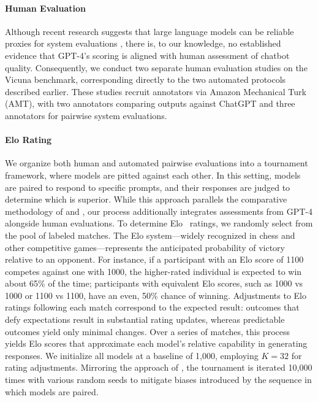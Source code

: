 \paragraph{Human Evaluation} Although recent research suggests that large language models can be reliable proxies for system evaluations \citep{fu2023gptscore}, there is, to our knowledge, no established evidence that GPT-4’s scoring is aligned with human assessment of chatbot quality. Consequently, we conduct two separate human evaluation studies on the Vicuna benchmark, corresponding directly to the two automated protocols described earlier. These studies recruit annotators via Amazon Mechanical Turk (AMT), with two annotators comparing outputs against ChatGPT and three annotators for pairwise system evaluations.

\paragraph{Elo Rating} We organize both human and automated pairwise evaluations into a tournament framework, where models are pitted against each other. In this setting, models are paired to respond to specific prompts, and their responses are judged to determine which is superior. While this approach parallels the comparative methodology of \citet{bai2022training} and \citet{vicuna2023}, our process additionally integrates assessments from GPT-4 alongside human evaluations. To determine Elo~\citep{elo1967proposed,elo1978rating} ratings, we randomly select from the pool of labeled matches. The Elo system—widely recognized in chess and other competitive games—represents the anticipated probability of victory relative to an opponent. For instance, if a participant with an Elo score of 1100 competes against one with 1000, the higher-rated individual is expected to win about 65\% of the time; participants with equivalent Elo scores, such as 1000 vs 1000 or 1100 vs 1100, have an even, 50\% chance of winning. Adjustments to Elo ratings following each match correspond to the expected result: outcomes that defy expectations result in substantial rating updates, whereas predictable outcomes yield only minimal changes. Over a series of matches, this process yields Elo scores that approximate each model's relative capability in generating responses. We initialize all models at a baseline of 1,000, employing $K=32$ for rating adjustments. Mirroring the approach of \citet{vicuna2023}, the tournament is iterated 10,000 times with various random seeds to mitigate biases introduced by the sequence in which models are paired.

